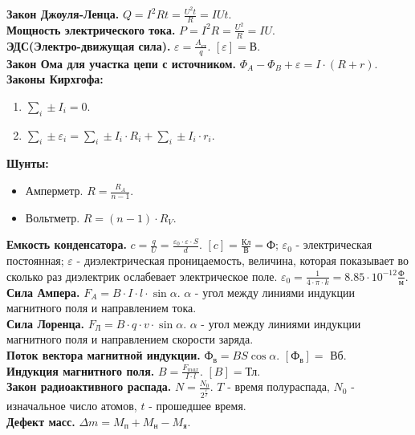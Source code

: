 \documentclass[12pt]{article}
\begin{document}
	\textbf{Закон Джоуля-Ленца.} $Q = I^2Rt = \frac{U^2t}{R} = IUt$. \\
	\textbf{Мощность электрического тока.} $P = I^2R = \frac{U^2}{R} = IU$. \\
	\textbf{ЭДС(Электро-движущая сила).} $\varepsilon = \frac{A_{\text{ст}}}{q}$. $[\varepsilon] = \text{В}$. \\
	\textbf{Закон Ома для участка цепи с источником.} $\Phi_{A} - \Phi_{B} + \varepsilon = I \cdot (R + r)$. \\
	\textbf{Законы Кирхгофа:}
	\begin{enumerate}
		\item $\sum \limits_{i} \pm I_{i} = 0$.
		\item $\sum \limits_{i} \pm \varepsilon_{i} = \sum \limits_{i} \pm I_{i} \cdot R_{i} + \sum \limits_{i} \pm I_{i} \cdot r_{i}$.
	\end{enumerate}
	\textbf{Шунты:}
	\begin{itemize}
		\item Амперметр. $R = \frac{R_{A}}{n - 1}$.
		\item Вольтметр. $R = (n - 1) \cdot R_{V}$.
	\end{itemize}
	\textbf{Емкость конденсатора.} $c = \frac{q}{U} = \frac{\varepsilon_{0} \cdot \varepsilon \cdot S}{d}$. $[c] = \frac{\text{Кл}}{\text{В}} = \text{Ф}$; $\varepsilon_{0}$ - электрическая постоянная; $\varepsilon$ - диэлектрическая проницаемость, величина, которая показывает во сколько раз диэлектрик ослабевает электрическое поле. $\varepsilon_{0} = \frac{1}{4 \cdot \pi \cdot k} = 8.85 \cdot 10^{-12} \frac{\text{Ф}}{\text{м}}$. \\
	\textbf{Сила Ампера.} $F_{A} = B \cdot I \cdot l \cdot \sin\alpha$. $\alpha$ - угол между линиями индукции магнитного поля и направлением тока. \\
	\textbf{Сила Лоренца.} $F_{\text{Л}} = B \cdot q \cdot v \cdot \sin\alpha$. $\alpha$ - угол между линиями индукции магнитного поля и направлением скорости заряда. \\
	\textbf{Поток вектора магнитной индукции.} $\text{Ф}_{\text{в}} = BS \cos\alpha$. $[\text{Ф}_{\text{в}}] =$ Вб. \\
	\textbf{Индукция магнитного поля.} $B = \frac{F_{max}}{I \cdot l}$. $[B] = \text{Тл}$. \\
	\textbf{Закон радиоактивного распада.} $N = \frac{N_{0}}{2^{\frac{t}{T}}}$. $T$ - время полураспада, $N_{0}$ - изначальное число атомов, $t$ - прошедшее время. \\
	\textbf{Дефект масс.} $\varDelta m = M_{\text{п}} + M_{\text{н}} - M_{\text{я}}$. \\
\end{document}
